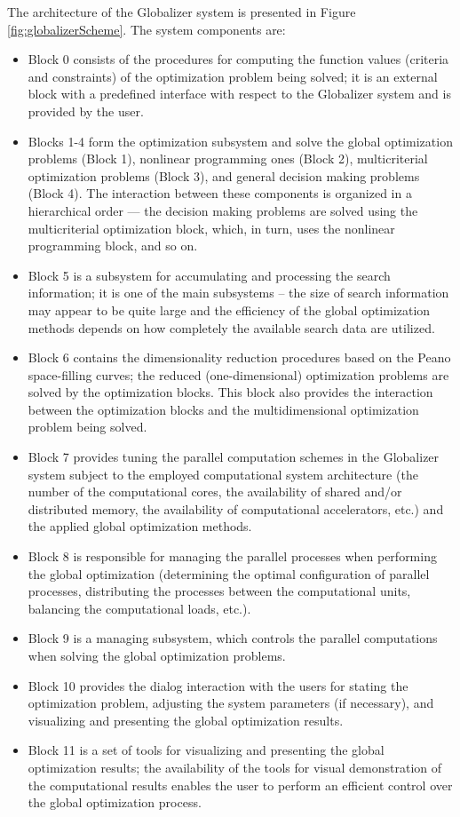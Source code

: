 \documentclass{aims}
\theoremstyle{definition}
\begin{document}
\par
The architecture of the Globalizer system is presented in Figure \ref{fig:globalizerScheme}.
The system components are:
\begin{itemize}
  \item Block 0 consists of the procedures for computing the function values
  (criteria and constraints) of the optimization problem being solved; it is an external
  block with a predefined interface with respect to the Globalizer system and is provided by the user.
  \item Blocks 1-4 form the optimization subsystem and solve the global optimization
  problems (Block 1), nonlinear programming ones (Block 2), multicriterial optimization problems
  (Block 3), and general decision making problems (Block 4). The interaction between these
  components is organized in a hierarchical order --- the decision making problems are
  solved using the multicriterial optimization block, which, in turn, uses the nonlinear programming block, and so on.
  \item Block 5 is a subsystem for accumulating and processing the search information; it is one of the main subsystems – the size of search information may appear to be quite large and the efficiency of the global optimization methods depends on how completely the available search data are utilized.
  \item Block 6 contains the dimensionality reduction procedures based on the Peano space-filling curves; the reduced (one-dimensional) optimization problems are solved by the optimization blocks. This block also provides the interaction between the optimization blocks and the multidimensional optimization problem being solved.
  \item Block 7 provides tuning the parallel computation schemes in the Globalizer system subject to the employed computational system architecture (the number of the computational cores, the availability of shared and/or distributed memory, the availability of computational accelerators, etc.) and the applied global optimization methods.
  \item Block 8 is responsible for managing the parallel processes when performing the global optimization (determining the optimal configuration of parallel processes, distributing the processes between the computational units, balancing the computational loads, etc.).
  \item Block 9 is a managing subsystem, which controls the parallel computations when solving the global optimization problems.
  \item Block 10 provides the dialog interaction with the users for stating the optimization problem, adjusting the system parameters (if necessary), and visualizing and presenting the global optimization results.
  \item Block 11 is a set of tools for visualizing and presenting the global optimization results; the availability of the tools for visual demonstration of the computational results enables the user to perform an efficient control over the global optimization process.
\end{itemize}
\end{document}
